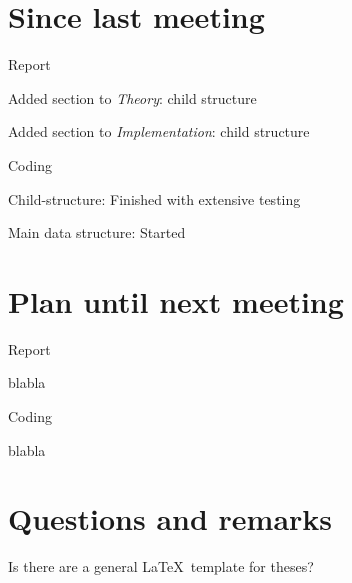 \documentclass[a4paper,11pt,agenda,chair]{meetingmins}
\begin{document}
\maketitle

\section{Since last meeting}
\begin{items}
\item Report
	\begin{items}
		\item Added section to \textit{Theory}: child structure
		\item Added section to \textit{Implementation}: child structure 
	\end{items}
\item Coding
	\begin{items}
		\item Child-structure: Finished with extensive testing
		\item Main data structure: Started
	\end{items}
\end{items}

\section{Plan until next meeting}
\begin{items}
\item Report
	\begin{items}
		\item blabla
	\end{items}
\item Coding
	\begin{items}
		\item blabla
	\end{items}
\end{items}

\section{Questions and remarks}
\begin{items}
	\item Is there are a general \LaTeX~template for theses?
\end{items}
\end{document}
